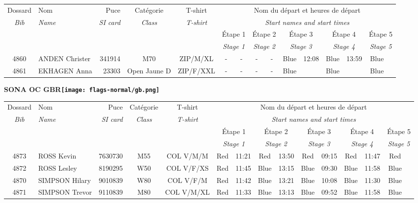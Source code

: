 \documentclass{report}
\begin{document}
  \begin{longtable}{|c|l|r|c|c|*{5}{cc|}}
    Dossard & Nom  & Puce    & Catégorie & T-shirt & \multicolumn{10}{c|}{Nom du départ et heures de départ} \\
    \itshape Bib     & \itshape Name & \itshape SI card & \itshape Class  & \itshape  T-shirt  & \multicolumn{10}{c|}{\itshape Start names and start times} \\
    \hline
    & & & & & \multicolumn{2}{c|}{Étape 1} & \multicolumn{2}{c|}{Étape 2} & \multicolumn{2}{c|}{Étape 3} & \multicolumn{2}{c|}{Étape 4} & \multicolumn{2}{c|}{Étape 5} \\
    & & & & & \multicolumn{2}{c|}{\itshape Stage 1} & \multicolumn{2}{c|}{\itshape Stage 2} & \multicolumn{2}{c|}{\itshape Stage 3} & \multicolumn{2}{c|}{\itshape Stage 4} & \multicolumn{2}{c|}{\itshape Stage 5} \\
    \hline
    4860 & ANDEN Christer & 341914 & M70 & ZIP/M/XL & - &  - & - &  - & Blue & 12:08 & Blue & 13:59 & Blue &  \\
    4861 & EKHAGEN Anna & 23303 & Open Jaune D & ZIP/F/XXL & - &  - & - &  - & Blue &   & Blue &   & Blue &  \\
  \end{longtable}
\newpage
  \Huge \centering \bfseries SONA OC  GBR\normalfont \footnotesize \sffamily \hfill \texttt{[image: flags-normal/gb.png]} \newline 
  \begin{longtable}{|c|l|r|c|c|*{5}{cc|}}
    Dossard & Nom  & Puce    & Catégorie & T-shirt & \multicolumn{10}{c|}{Nom du départ et heures de départ} \\
    \itshape Bib     & \itshape Name & \itshape SI card & \itshape Class  & \itshape  T-shirt  & \multicolumn{10}{c|}{\itshape Start names and start times} \\
    \hline
    & & & & & \multicolumn{2}{c|}{Étape 1} & \multicolumn{2}{c|}{Étape 2} & \multicolumn{2}{c|}{Étape 3} & \multicolumn{2}{c|}{Étape 4} & \multicolumn{2}{c|}{Étape 5} \\
    & & & & & \multicolumn{2}{c|}{\itshape Stage 1} & \multicolumn{2}{c|}{\itshape Stage 2} & \multicolumn{2}{c|}{\itshape Stage 3} & \multicolumn{2}{c|}{\itshape Stage 4} & \multicolumn{2}{c|}{\itshape Stage 5} \\
    \hline
    4873 & ROSS Kevin & 7630730 & M55 & COL V/M/M & Red & 11:21 & Red & 13:50 & Red & 09:15 & Red & 11:47 & Red &  \\
    4872 & ROSS Lesley & 8190295 & W50 & COL V/F/XS & Red & 11:45 & Blue & 13:15 & Blue & 09:30 & Blue & 11:58 & Blue &  \\
    4870 & SIMPSON Hilary & 9010839 & W80 & COL V/F/M & Red & 11:42 & Blue & 13:21 & Blue & 10:08 & Blue & 11:30 & Blue &  \\
    4871 & SIMPSON Trevor & 9110839 & M80 & COL V/M/XL & Red & 11:33 & Blue & 13:13 & Blue & 09:52 & Blue & 11:58 & Blue &  \\
  \end{longtable}
\end{document}
